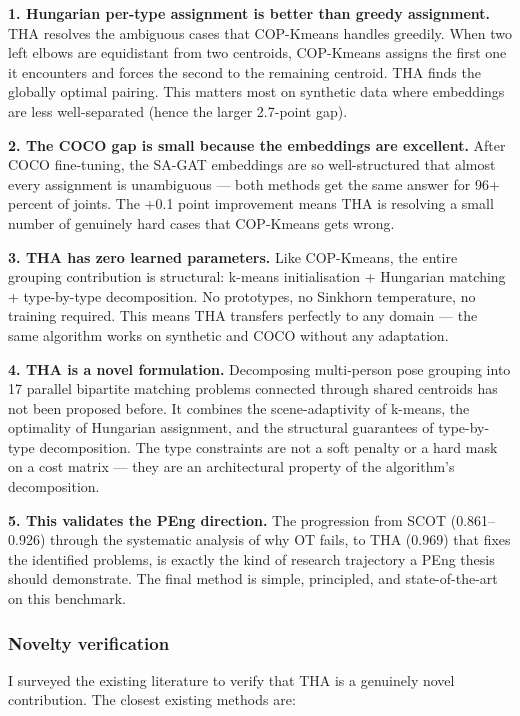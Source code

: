 \textbf{1. Hungarian per-type assignment is better than greedy assignment.} THA resolves the ambiguous cases that COP-Kmeans handles greedily. When two left elbows are equidistant from two centroids, COP-Kmeans assigns the first one it encounters and forces the second to the remaining centroid. THA finds the globally optimal pairing. This matters most on synthetic data where embeddings are less well-separated (hence the larger 2.7-point gap).

\textbf{2. The COCO gap is small because the embeddings are excellent.} After COCO fine-tuning, the SA-GAT embeddings are so well-structured that almost every assignment is unambiguous --- both methods get the same answer for 96+ percent of joints. The +0.1 point improvement means THA is resolving a small number of genuinely hard cases that COP-Kmeans gets wrong.

\textbf{3. THA has zero learned parameters.} Like COP-Kmeans, the entire grouping contribution is structural: k-means initialisation + Hungarian matching + type-by-type decomposition. No prototypes, no Sinkhorn temperature, no training required. This means THA transfers perfectly to any domain --- the same algorithm works on synthetic and COCO without any adaptation.

\textbf{4. THA is a novel formulation.} Decomposing multi-person pose grouping into 17 parallel bipartite matching problems connected through shared centroids has not been proposed before. It combines the scene-adaptivity of k-means, the optimality of Hungarian assignment, and the structural guarantees of type-by-type decomposition. The type constraints are not a soft penalty or a hard mask on a cost matrix --- they are an architectural property of the algorithm's decomposition.

\textbf{5. This validates the PEng direction.} The progression from SCOT (0.861--0.926) through the systematic analysis of why OT fails, to THA (0.969) that fixes the identified problems, is exactly the kind of research trajectory a PEng thesis should demonstrate. The final method is simple, principled, and state-of-the-art on this benchmark.

\subsubsection{Novelty verification}

I surveyed the existing literature to verify that THA is a genuinely novel contribution. The closest existing methods are:

